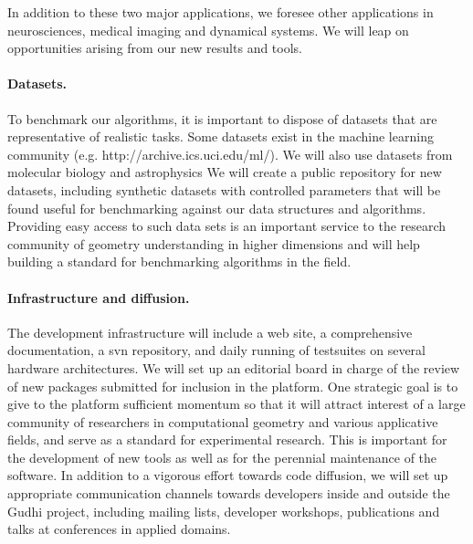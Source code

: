 In addition to these two major applications, we foresee other
applications in neurosciences, medical imaging and dynamical
systems. We will leap on opportunities arising from our new results
and tools.




\paragraph{Datasets.}
To benchmark our algorithms, it is important to dispose of datasets
that are representative of realistic tasks. Some datasets exist in the
machine learning community (e.g. http://archive.ics.uci.edu/ml/). We
will also use datasets from molecular biology and astrophysics  We
will create a public repository for new datasets, including synthetic
datasets with controlled parameters that will be found useful for
benchmarking against our data structures and algorithms. Providing easy
access to such data sets is an important service to the research
community of geometry understanding in higher dimensions and will help
building a standard for benchmarking algorithms in the field.


\paragraph{Infrastructure and diffusion.}
The development infrastructure will include a web site, a
comprehensive documentation, a svn repository, and daily running of
testsuites on several hardware architectures.  We will set up an
editorial board in charge of the review of new packages
submitted for inclusion in the platform.  One strategic goal is to
give to the platform sufficient momentum so that it will  attract
interest of a large community of researchers in computational geometry
and various applicative fields, and serve as a standard for
experimental research. This is important for the development of new
tools as well as for the perennial maintenance of the software. In
addition to a vigorous effort towards code diffusion, we will set up
appropriate communication channels towards developers inside and
outside the Gudhi project, including mailing lists, developer
workshops, publications and talks at conferences in applied domains.















